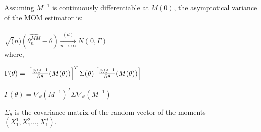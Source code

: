 Assuming $M^{-1}$ is continuously differentiable at $M(0)$, the asymptotical variance of the MOM estimator is:\\\\

$\sqrt(n)(\widehat{\theta_n^{MM}} - \theta) \xrightarrow[n \rightarrow \infty]{(d)} N(0,\Gamma)$\\

where,

$\Gamma (\theta )=\\
\left[\frac{\partial M^{-1}}{\partial \theta } (M(\theta ))\right]^{T} \Sigma (\theta )\left[\frac{\partial M^{-1}}{\partial \theta } (M(\theta ))\right]$

$\Gamma(\theta) = \nabla_{\theta}(M^{-1})^{T} \Sigma \nabla_{\theta}(M^{-1}) $

$\Sigma_{\theta}$ is the covariance matrix of the random vector of the moments $(X_1^1,X_1^2 \ldots, X_1^d)$.